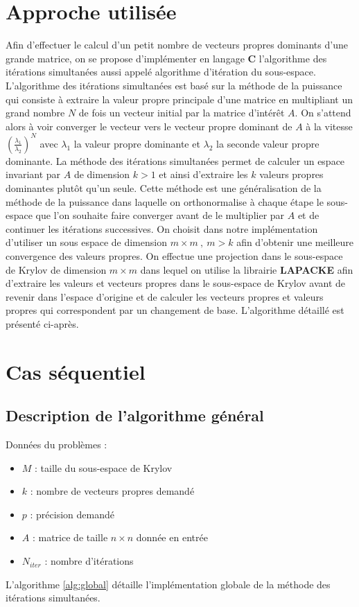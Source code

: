\documentclass[11pt,a4paper]{article}
\begin{document}
\section{Approche utilisée}
	Afin d'effectuer le calcul d'un petit nombre de vecteurs propres dominants d'une grande matrice, on se propose d'implémenter en langage \textbf{C} l'algorithme des itérations simultanées aussi appelé algorithme d'itération du sous-espace.
	L'algorithme des itérations simultanées est basé sur la méthode de la puissance qui consiste à extraire la valeur propre principale d'une matrice en multipliant un grand nombre $N$ de fois un vecteur initial par la matrice d'intérêt $A$. On s'attend alors à voir converger le vecteur vers le vecteur propre dominant de $A$ à la vitesse $\left(\frac{\lambda_1}{\lambda_2}\right)^N$ avec $\lambda_1$ la valeur propre dominante et $\lambda_2$ la seconde valeur propre dominante.
	La méthode des itérations simultanées permet de calculer un espace invariant par $A$ de dimension $k > 1$ et ainsi d'extraire les $k$ valeurs propres dominantes plutôt qu'un seule. Cette méthode est une généralisation de la méthode de la puissance dans laquelle on orthonormalise à chaque étape le sous-espace que l'on souhaite faire converger avant de le multiplier par $A$ et de continuer les itérations successives. On choisit dans notre implémentation d'utiliser un sous espace de dimension $m\times m\:,\: m > k$ afin d'obtenir une meilleure convergence des valeurs propres. On effectue une projection dans le sous-espace de Krylov de dimension $m\times m$ dans lequel on utilise la librairie \textbf{LAPACKE} afin d'extraire les valeurs et vecteurs propres dans le sous-espace de Krylov avant de revenir dans l'espace d'origine et de calculer les vecteurs propres et valeurs propres qui correspondent par un changement de base. L'algorithme détaillé est présenté ci-après.

\section{Cas séquentiel}

	\subsection{Description de l'algorithme général}

		Données du problèmes :

		\begin{itemize}
			\item $M$ : taille du sous-espace de Krylov
			\item $k$ : nombre de vecteurs propres demandé
			\item $p$ : précision demandé
			\item $A$ : matrice de taille $n\times n$ donnée en entrée
			\item $N_{iter}$ : nombre d'itérations
		\end{itemize}
		\vspace{1cm}
		L'algorithme \ref{alg:global} détaille l'implémentation globale de la méthode des itérations simultanées.
\end{document}

